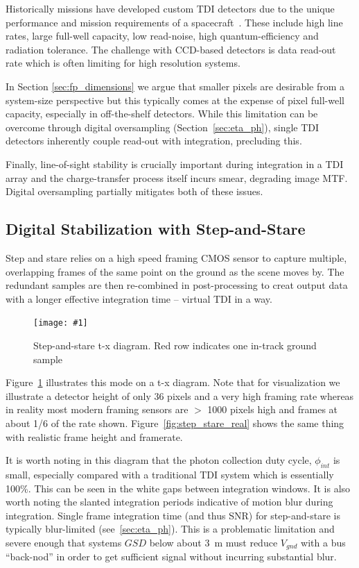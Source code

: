 \documentclass[10pt,journal]{IEEEtran}  %
\newcommand{\includefigure}[3]
{
  \begin{figure}[h!]
  \centering
  \texttt{[image: \#1]}
  \caption[]{#3}
  \label{#2}
  \end{figure}
}
\begin{document}
Historically missions have developed custom TDI detectors due to the unique performance and mission requirements of a spacecraft~\cite{jerram}.  These include high line rates, large full-well capacity, low read-noise, high quantum-efficiency and radiation tolerance.  The challenge with CCD-based detectors is data read-out rate which is often limiting for high resolution systems.

In Section \ref{sec:fp_dimensions} we argue that smaller pixels are desirable from a system-size perspective but this typically comes at the expense of pixel full-well capacity, especially in off-the-shelf detectors.  
While  this limitation can be overcome through digital oversampling (Section~\ref{sec:eta_ph}), single TDI detectors inherently couple read-out with integration, precluding this. 

Finally, line-of-sight stability is crucially important during integration in a TDI array \cite{pittelkau} and the charge-transfer process itself incurs smear\cite{fiete_blur}, degrading image MTF.  Digital oversampling partially mitigates both of these issues.

\subsection{Digital Stabilization with Step-and-Stare}
Step and stare relies on a high speed framing CMOS sensor to capture multiple, overlapping frames of the same point on the ground as the scene moves by.  The redundant samples are then re-combined in post-processing to creat output data with a longer effective integration time -- virtual TDI in a way.

\includefigure{figures/step_stare.pgf}{fig:step_stare}{Step-and-stare t-x diagram.  Red row indicates one in-track ground sample}

Figure~\ref{fig:step_stare} illustrates this mode on a t-x diagram.  Note that for visualization we illustrate a detector height of only 36 pixels and a very high framing rate whereas in reality most modern framing sensors are $>$ 1000 pixels high and frames at about 1/6 of the rate shown.  Figure~\ref{fig:step_stare_real} shows the same thing with realistic frame height and framerate.

It is worth noting in this diagram that the photon collection duty cycle, $\phi_{int}$ is small, especially compared with a traditional TDI system which is essentially 100\%.  This can be seen in the white gaps between integration windows.  It is also worth noting the slanted integration periods indicative of motion blur during integration.  Single frame integration time (and thus SNR) for step-and-stare is typically blur-limited (see~\ref{sec:eta_ph}).  This is a problematic limitation and severe enough that systems $GSD$ below about 3~m must reduce $V_{gnd}$ with a bus ``back-nod'' in order to get sufficient signal without incurring substantial blur.
\end{document}

